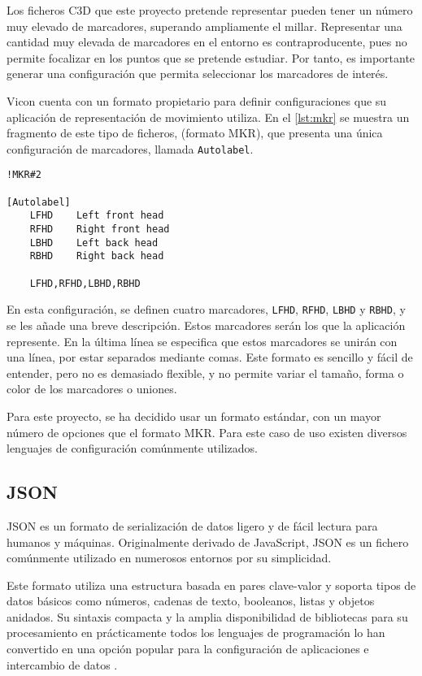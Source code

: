 Los ficheros \ac{C3D} que este proyecto pretende representar pueden tener un número muy elevado de marcadores, superando ampliamente el millar. Representar una cantidad muy elevada de marcadores en el entorno es contraproducente, pues no permite focalizar en los puntos que se pretende estudiar. Por tanto, es importante generar una configuración que permita seleccionar los marcadores de interés.

Vicon cuenta con un formato propietario para definir configuraciones que su aplicación de representación de movimiento utiliza. En el \autoref{lst:mkr} se muestra un fragmento de este tipo de ficheros, (formato MKR), que presenta una única configuración de marcadores, llamada \texttt{Autolabel}.

\newpage

\begin{lstlisting}[style=mystyle, caption={Fragmento de un fichero MKR}, label=lst:mkr]
!MKR#2

[Autolabel]
	LFHD	Left front head
	RFHD	Right front head
	LBHD	Left back head
	RBHD	Right back head

    LFHD,RFHD,LBHD,RBHD
\end{lstlisting}

En esta configuración, se definen cuatro marcadores, \texttt{LFHD}, \texttt{RFHD}, \texttt{LBHD} y \texttt{RBHD}, y se les añade una breve descripción. Estos marcadores serán los que la aplicación represente. En la última línea se especifica que estos marcadores se unirán con una línea, por estar separados mediante comas. Este formato es sencillo y fácil de entender, pero no es demasiado flexible, y no permite variar el tamaño, forma o color de los marcadores o uniones.

Para este proyecto, se ha decidido usar un formato estándar, con un mayor número de opciones que el formato MKR. Para este caso de uso existen diversos lenguajes de configuración comúnmente utilizados.

\subsection{\acs{JSON}}

\ac{JSON} es un formato de serialización de datos ligero y de fácil lectura para humanos y máquinas. Originalmente derivado de JavaScript, \ac{JSON} es un fichero comúnmente utilizado en numerosos entornos por su simplicidad.

Este formato utiliza una estructura basada en pares clave-valor y soporta tipos de datos básicos como números, cadenas de texto, booleanos, listas y objetos anidados. Su sintaxis compacta y la amplia disponibilidad de bibliotecas para su procesamiento en prácticamente todos los lenguajes de programación lo han convertido en una opción popular para la configuración de aplicaciones e intercambio de datos \autocite{ECMA404}.

